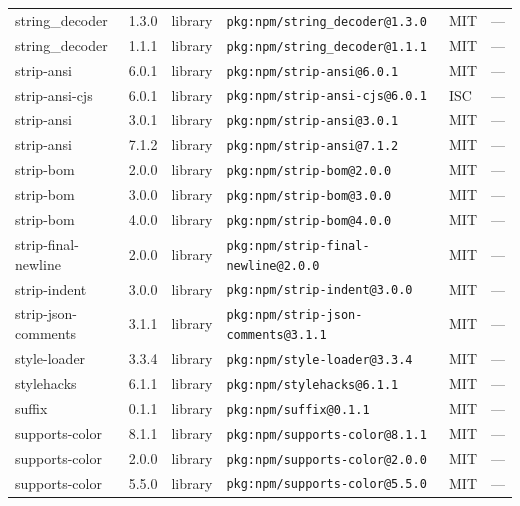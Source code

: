 \documentclass[11pt,a4paper]{article}
\begin{document}
\begin{longtable}{|p{4cm}|p{2cm}|p{1.6cm}|p{5cm}|p{1.5cm}|p{3.5cm}|}
\raggedright string\_decoder & 1.3.0 & library & \small\texttt{pkg:npm/string\_decoder@1.3.0} & MIT & \small — \\
\raggedright string\_decoder & 1.1.1 & library & \small\texttt{pkg:npm/string\_decoder@1.1.1} & MIT & \small — \\
\raggedright strip-ansi & 6.0.1 & library & \small\texttt{pkg:npm/strip-ansi@6.0.1} & MIT & \small — \\
\raggedright strip-ansi-cjs & 6.0.1 & library & \small\texttt{pkg:npm/strip-ansi-cjs@6.0.1} & ISC & \small — \\
\raggedright strip-ansi & 3.0.1 & library & \small\texttt{pkg:npm/strip-ansi@3.0.1} & MIT & \small — \\
\raggedright strip-ansi & 7.1.2 & library & \small\texttt{pkg:npm/strip-ansi@7.1.2} & MIT & \small — \\
\raggedright strip-bom & 2.0.0 & library & \small\texttt{pkg:npm/strip-bom@2.0.0} & MIT & \small — \\
\raggedright strip-bom & 3.0.0 & library & \small\texttt{pkg:npm/strip-bom@3.0.0} & MIT & \small — \\
\raggedright strip-bom & 4.0.0 & library & \small\texttt{pkg:npm/strip-bom@4.0.0} & MIT & \small — \\
\raggedright strip-final-newline & 2.0.0 & library & \small\texttt{pkg:npm/strip-final-newline@2.0.0} & MIT & \small — \\
\raggedright strip-indent & 3.0.0 & library & \small\texttt{pkg:npm/strip-indent@3.0.0} & MIT & \small — \\
\raggedright strip-json-comments & 3.1.1 & library & \small\texttt{pkg:npm/strip-json-comments@3.1.1} & MIT & \small — \\
\raggedright style-loader & 3.3.4 & library & \small\texttt{pkg:npm/style-loader@3.3.4} & MIT & \small — \\
\raggedright stylehacks & 6.1.1 & library & \small\texttt{pkg:npm/stylehacks@6.1.1} & MIT & \small — \\
\raggedright suffix & 0.1.1 & library & \small\texttt{pkg:npm/suffix@0.1.1} & MIT & \small — \\
\raggedright supports-color & 8.1.1 & library & \small\texttt{pkg:npm/supports-color@8.1.1} & MIT & \small — \\
\raggedright supports-color & 2.0.0 & library & \small\texttt{pkg:npm/supports-color@2.0.0} & MIT & \small — \\
\raggedright supports-color & 5.5.0 & library & \small\texttt{pkg:npm/supports-color@5.5.0} & MIT & \small — \\

\end{longtable}
\end{document}
